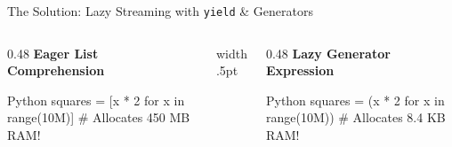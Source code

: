 \begin{frame}[fragile]{The Solution: Lazy Streaming with \texttt{yield} \& Generators}
  \begin{columns}[T,onlytextwidth]
    \begin{column}{0.48\textwidth}
      {\small\bfseries\color{UpGradRed}Eager List Comprehension \InlineCode{[...]}}\par\vspace{0.08cm}
      \begin{CodeBlock}{Python}
squares = [x * 2 for x in range(10M)]
# Allocates 450 MB RAM!
      \end{CodeBlock}
      \vspace{0.08cm}
    \end{column}
    \hfill{\color{UpGradRule}\vrule width .5pt}\hfill
    \begin{column}{0.48\textwidth}
      {\small\bfseries\color{AWSEmerald}Lazy Generator Expression }\par\vspace{0.08cm}
      \begin{CodeBlock}{Python}
squares = (x * 2 for x in range(10M))
# Allocates 8.4 KB RAM!
      \end{CodeBlock}
      \vspace{0.08cm}
    \end{column}
  \end{columns}
  \vspace{0.15cm}
\end{frame}

